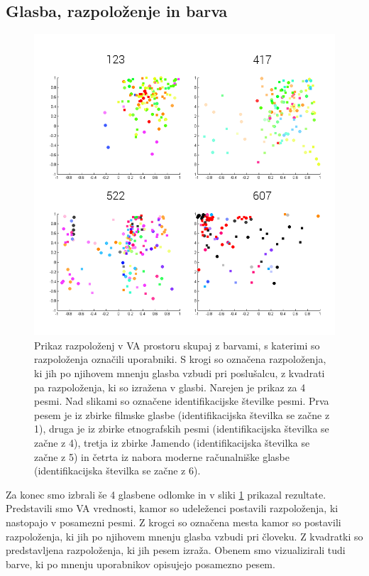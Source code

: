 \documentclass[a4paper, 12pt]{book}
\begin{document}
{\subsection{Glasba, razpoloženje in barva}

\begin{figure}[hbt]
\centering
\includegraphics[width=12.5cm]{images/moodmusic.png}

\caption{Prikaz razpoloženj v VA prostoru skupaj z barvami, s katerimi so razpoloženja označili uporabniki. S krogi so označena razpoloženja, ki jih po njihovem mnenju glasba vzbudi pri poslušalcu, z kvadrati pa razpoloženja, ki so izražena v glasbi. Narejen je prikaz za 4 pesmi. Nad slikami so označene identifikacijske številke pesmi. Prva pesem je iz zbirke filmske glasbe (identifikacijska številka se začne z 1), druga je iz zbirke etnografskih pesmi (identifikacijska številka se začne z 4), tretja iz zbirke Jamendo (identifikacijska številka se začne z 5) in četrta iz nabora moderne računalniške glasbe (identifikacijska številka se začne z 6).}
\label{moodmusic}
\end{figure} 

Za konec smo izbrali še 4 glasbene odlomke in v sliki \ref{moodmusic} prikazal rezultate. Predstavili smo VA vrednosti, kamor so udeleženci postavili razpoloženja, ki nastopajo v posamezni pesmi. Z krogci so označena mesta kamor so postavili razpoloženja, ki jih po njihovem mnenju glasba vzbudi pri človeku. Z kvadratki so predstavljena razpoloženja, ki jih pesem izraža. Obenem smo vizualizirali tudi barve, ki po mnenju uporabnikov opisujejo posamezno pesem. 

}
\end{document}
